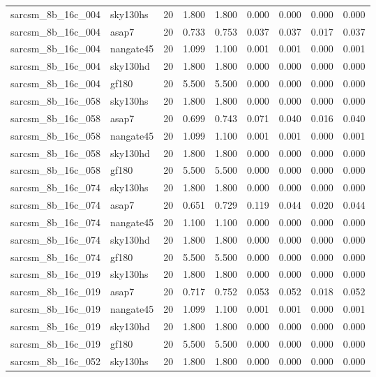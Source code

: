 \begin{tabular}{llrrrrrrr}
sarcsm\_8b\_16c\_004 & sky130hs & 20 & 1.800 & 1.800 & 0.000 & 0.000 & 0.000 & 0.000 \\
sarcsm\_8b\_16c\_004 & asap7 & 20 & 0.733 & 0.753 & 0.037 & 0.037 & 0.017 & 0.037 \\
sarcsm\_8b\_16c\_004 & nangate45 & 20 & 1.099 & 1.100 & 0.001 & 0.001 & 0.000 & 0.001 \\
sarcsm\_8b\_16c\_004 & sky130hd & 20 & 1.800 & 1.800 & 0.000 & 0.000 & 0.000 & 0.000 \\
sarcsm\_8b\_16c\_004 & gf180 & 20 & 5.500 & 5.500 & 0.000 & 0.000 & 0.000 & 0.000 \\
sarcsm\_8b\_16c\_058 & sky130hs & 20 & 1.800 & 1.800 & 0.000 & 0.000 & 0.000 & 0.000 \\
sarcsm\_8b\_16c\_058 & asap7 & 20 & 0.699 & 0.743 & 0.071 & 0.040 & 0.016 & 0.040 \\
sarcsm\_8b\_16c\_058 & nangate45 & 20 & 1.099 & 1.100 & 0.001 & 0.001 & 0.000 & 0.001 \\
sarcsm\_8b\_16c\_058 & sky130hd & 20 & 1.800 & 1.800 & 0.000 & 0.000 & 0.000 & 0.000 \\
sarcsm\_8b\_16c\_058 & gf180 & 20 & 5.500 & 5.500 & 0.000 & 0.000 & 0.000 & 0.000 \\
sarcsm\_8b\_16c\_074 & sky130hs & 20 & 1.800 & 1.800 & 0.000 & 0.000 & 0.000 & 0.000 \\
sarcsm\_8b\_16c\_074 & asap7 & 20 & 0.651 & 0.729 & 0.119 & 0.044 & 0.020 & 0.044 \\
sarcsm\_8b\_16c\_074 & nangate45 & 20 & 1.100 & 1.100 & 0.000 & 0.000 & 0.000 & 0.000 \\
sarcsm\_8b\_16c\_074 & sky130hd & 20 & 1.800 & 1.800 & 0.000 & 0.000 & 0.000 & 0.000 \\
sarcsm\_8b\_16c\_074 & gf180 & 20 & 5.500 & 5.500 & 0.000 & 0.000 & 0.000 & 0.000 \\
sarcsm\_8b\_16c\_019 & sky130hs & 20 & 1.800 & 1.800 & 0.000 & 0.000 & 0.000 & 0.000 \\
sarcsm\_8b\_16c\_019 & asap7 & 20 & 0.717 & 0.752 & 0.053 & 0.052 & 0.018 & 0.052 \\
sarcsm\_8b\_16c\_019 & nangate45 & 20 & 1.099 & 1.100 & 0.001 & 0.001 & 0.000 & 0.001 \\
sarcsm\_8b\_16c\_019 & sky130hd & 20 & 1.800 & 1.800 & 0.000 & 0.000 & 0.000 & 0.000 \\
sarcsm\_8b\_16c\_019 & gf180 & 20 & 5.500 & 5.500 & 0.000 & 0.000 & 0.000 & 0.000 \\
sarcsm\_8b\_16c\_052 & sky130hs & 20 & 1.800 & 1.800 & 0.000 & 0.000 & 0.000 & 0.000 \\

\end{tabular}
